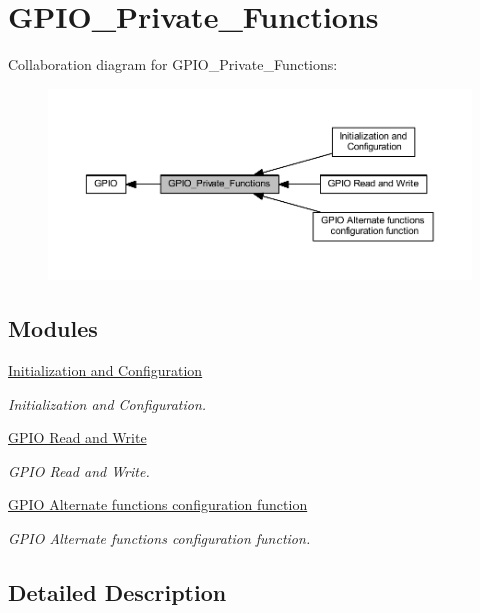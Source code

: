 \hypertarget{group___g_p_i_o___private___functions}{}\section{G\+P\+I\+O\+\_\+\+Private\+\_\+\+Functions}
\label{group___g_p_i_o___private___functions}
Collaboration diagram for G\+P\+I\+O\+\_\+\+Private\+\_\+\+Functions\+:
\nopagebreak
\begin{figure}[H]
\begin{center}
\leavevmode
\includegraphics[width=350pt]{group___g_p_i_o___private___functions}
\end{center}
\end{figure}
\subsection*{Modules}
\begin{DoxyCompactItemize}
\item 
\hyperlink{group___g_p_i_o___group1}{Initialization and Configuration}
\begin{DoxyCompactList}\small\item\em Initialization and Configuration. \end{DoxyCompactList}\item 
\hyperlink{group___g_p_i_o___group2}{G\+P\+I\+O Read and Write}
\begin{DoxyCompactList}\small\item\em G\+P\+IO Read and Write. \end{DoxyCompactList}\item 
\hyperlink{group___g_p_i_o___group3}{G\+P\+I\+O Alternate functions configuration function}
\begin{DoxyCompactList}\small\item\em G\+P\+IO Alternate functions configuration function. \end{DoxyCompactList}\end{DoxyCompactItemize}


\subsection{Detailed Description}
